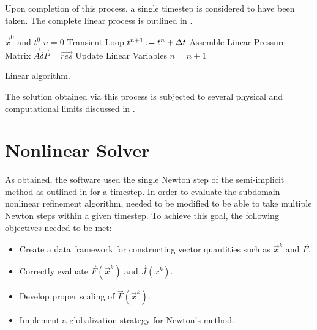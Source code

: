 Upon completion of this process, a single timestep is considered to have been taken.
The complete linear process is outlined in .

\begin{algo}[ht!]
\setlength{\baselineskip}{0.625\baselineskip}
\begin{algorithmic}[1]
\Require $\vec{x}^{0}$ and $t^{0}$
\Set $n = 0$
\Loop \; Transient Loop
    \Set $t^{n+1} : = t^{n} + \dt{}$
	\Algorithm Assemble Linear Pressure Matrix 
   	\Solve $\vec{A} \vec{\delta P} = \vec{res}$
	\Algorithm Update Linear Variables 
	\Set $n = n + 1$
\EndLoop
\end{algorithmic}
\caption{Linear \cobra{} algorithm.}
\label{alg:linCobraAlgorithm}
\end{algo}

The solution obtained via this process is subjected to several physical and computational limits discussed in .

\section{Nonlinear Solver}
\label{sect:nlnCobraSolver}
As obtained, the \cobra{} software used the single Newton step of the semi-implicit method as outlined in  for a timestep.
In order to evaluate the subdomain nonlinear refinement algorithm, \cobra{} needed to be modified to be able to take multiple Newton steps within a given timestep.
To achieve this goal, the following objectives needed to be met:

\begin{itemize}
\item{Create a data framework for constructing vector quantities such as $\vec{x}^{k}$ and $\vec{F}$.}
\item{Correctly evaluate $\vec{F}(\vec{x}^{k})$ and $\vec{J}(x^{k})$.}
\item{Develop proper scaling of $\vec{F}(\vec{x}^{k})$.}
\item{Implement a globalization strategy for Newton's method.}
\end{itemize}


